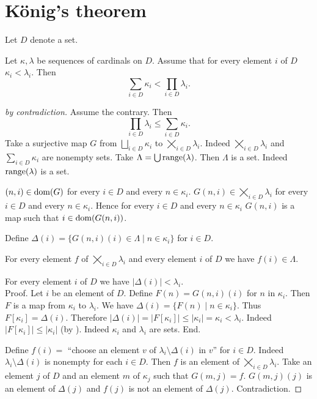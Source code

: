 \documentclass{article}
\newcommand{\SumSet}[2]{\bigsqcup_{i \in #2} #1_{i}}
\newcommand{\Sum}[2]{\sum_{i \in #2} #1_{i}}
\newcommand{\ProdSet}[2]{\bigtimes_{i \in #2} #1_{i}}
\newcommand{\Prod}[2]{\prod_{i \in #2} #1_{i}}
\begin{document}
\section*{König's theorem}

\begin{forthel}
  Let $D$ denote a set.

  \begin{theorem*}[König]\label{koenig}
    Let $\kappa, \lambda$ be sequences of cardinals on $D$.
    Assume that for every element $i$ of $D$ $\kappa_{i} < \lambda_{i}$.
    Then \[ \Sum{\kappa}{D} < \Prod{\lambda}{D}. \]
  \end{theorem*}
  \begin{proof}[by contradiction]
    Assume the contrary.
    Then \[ \Prod{\lambda}{D} \leq \Sum{\kappa}{D}. \]
    Take a surjective map $G$ from $\SumSet{\kappa}{D}$ to $\ProdSet{\lambda}{D}$.
    Indeed $\ProdSet{\lambda}{D}$ and $\Sum{\kappa}{D}$ are nonempty sets.
    Take $\Lambda = \bigcup \textrm{range}(\lambda)$.
    Then $\Lambda$ is a set.
    Indeed $\textrm{range}(\lambda)$ is a set.

    $(n,i) \in \operatorname{dom}(G)$ for every $i \in D$ and every $n \in \kappa_{i}$.
    $G(n,i) \in \ProdSet{\lambda}{D}$ for every $i \in D$ and every $n \in \kappa_{i}$.
    Hence for every $i \in D$ and every $n \in \kappa_{i}$ $G(n,i)$ is a map such that $i \in \operatorname{dom}(G(n,i))$.

    Define $\Delta(i) = \{ G(n,i)(i) \in \Lambda \mid n \in \kappa_{i} \}$ for $i \in D$.

    For every element $f$ of $\ProdSet{\lambda}{D}$ and every element $i$ of $D$ we have $f(i) \in \Lambda$.

    For every element $i$ of $D$ we have $|\Delta(i)| < \lambda_{i}$. \\
    Proof.
      Let $i$ be an element of $D$.
      Define $F(n) = G(n,i)(i)$ for $n$ in $\kappa_{i}$.
      Then $F$ is a map from $\kappa_{i}$ to $\lambda_{i}$.
      We have $\Delta(i) = \{ F(n) \mid n \in \kappa_{i} \}$.
      Thus $F[\kappa_{i}] = \Delta(i)$.
      Therefore $|\Delta(i)|
        = |F[\kappa_{i}]|
        \leq |\kappa_{i}|
        = \kappa_{i}
        < \lambda_{i}$.
      Indeed $|F[\kappa_{i}]| \leq |\kappa_{i}|$ (by ).
      Indeed $\kappa_{i}$ and $\lambda_{i}$ are sets.
    End.

    Define $f(i) =$ ``choose an element $v$ of $\lambda_{i} \setminus \Delta(i)$ in $v$'' for $i \in D$.
    Indeed $\lambda_{i} \setminus \Delta(i)$ is nonempty for each $i \in D$.
    Then $f$ is an element of $\ProdSet{\lambda}{D}$.
    Take an element $j$ of $D$ and an element $m$ of $\kappa_{j}$ such that $G(m,j) = f$.
    $G(m,j)(j)$ is an element of $\Delta(j)$ and $f(j)$ is not an element of $\Delta(j)$.
    Contradiction.
  \end{proof}
\end{forthel}

\printbibliography
\end{document}
